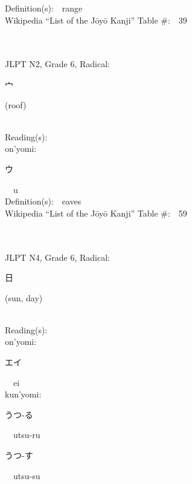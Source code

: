 \begin{multicols}{2}
Definition(s):\ \ range \\
Wikipedia ``List of the J\=oy\=o Kanji'' Table \#:\ \ 39 \\
\ \ \\
{\fontsize{34pt}{40pt}  }\ \ \\  %
{JLPT N2, Grade 6, Radical:\ \ {\begin{CJK}{UTF8}{min} 宀 \end{CJK}} (roof) } \\
Reading(s):\ \ \\
{\hspace*{1em}}on'yomi:\ \ \\
{\hspace*{2em}}{\begin{CJK}{UTF8}{min} ウ \end{CJK}}\ \ u\ \ \\
Definition(s):\ \ eaves \\
Wikipedia ``List of the J\=oy\=o Kanji'' Table \#:\ \ 59 \\
\ \ \\
{\fontsize{34pt}{40pt}  }\ \ \\  %
{JLPT N4, Grade 6, Radical:\ \ {\begin{CJK}{UTF8}{min} 日 \end{CJK}} (sun, day) } \\
Reading(s):\ \ \\
{\hspace*{1em}}on'yomi:\ \ \\
{\hspace*{2em}}{\begin{CJK}{UTF8}{min} エイ \end{CJK}}\ \ ei\ \ \\
{\hspace*{1em}}kun'yomi:\ \ \\
{\hspace*{2em}}{\begin{CJK}{UTF8}{min} うつ-る \end{CJK}}\ \ utsu-ru\ \ \\
{\hspace*{2em}}{\begin{CJK}{UTF8}{min} うつ-す \end{CJK}}\ \ utsu-su\ \ \\

\end{multicols}
